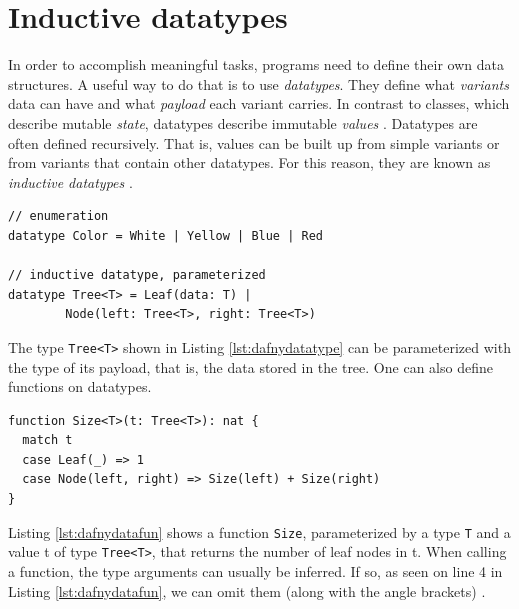 \documentclass[a4paper]{article}
\begin{document}
\section{Inductive datatypes}
In order to accomplish meaningful tasks, programs need to define their own data structures. A useful way to do that
is to use \textit{datatypes}. They define what \textit{variants} data can have and what \textit{payload} each variant
carries. In contrast to classes, which describe mutable \textit{state}, datatypes describe immutable \textit{values}
\cite{leino2023program}. Datatypes are often defined recursively. That is, values can be built up from simple
variants or from variants that contain other datatypes. For this reason, they are known as \textit{inductive datatypes}
\cite{leino2023program}.
\begin{lstlisting}[style=dafnystyle, caption={A simple and an inductive datatype.}, label={lst:dafnydatatype}]
// enumeration
datatype Color = White | Yellow | Blue | Red

// inductive datatype, parameterized
datatype Tree<T> = Leaf(data: T) | 
		Node(left: Tree<T>, right: Tree<T>)
\end{lstlisting}
The type \texttt{Tree<T>} shown in Listing \ref{lst:dafnydatatype} can be parameterized with the type of its payload,
that is, the data stored in the tree. One can also define functions on datatypes.
\begin{lstlisting}[style=dafnystyle, caption={A function defined on a datatype.}, label={lst:dafnydatafun}]
function Size<T>(t: Tree<T>): nat {
  match t
  case Leaf(_) => 1
  case Node(left, right) => Size(left) + Size(right)
}
\end{lstlisting}
Listing \ref{lst:dafnydatafun} shows a function \texttt{Size}, parameterized by a type \texttt{T} and a value t of type
\texttt{Tree<T>}, that returns the number of leaf nodes in t. When calling a function, the type arguments can
usually be inferred. If so, as seen on line 4 in Listing \ref{lst:dafnydatafun}, we can omit them
(along with the angle brackets) \cite{leino2023program}.
\end{document}
